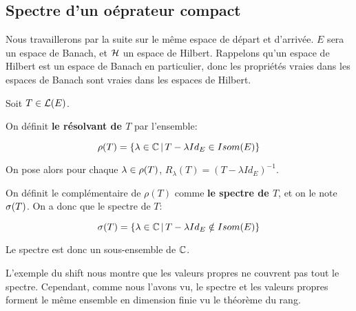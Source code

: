 

	

\subsection{Spectre d'un oéprateur compact}

Nous travaillerons par la suite sur le même espace de départ et d'arrivée. $E$
sera un espace de Banach, et $\mathcal{H}$ un espace de Hilbert.
Rappelons qu'un espace de Hilbert est un espace de Banach en particulier, donc
les propriétés vraies dans les espaces de Banach sont vraies dans les espaces de
Hilbert.

\begin{definition}
	Soit $T \in \mathcal{L}(E)$.

	On définit \textbf{le résolvant de $T$} par l'ensemble:

	\begin{equation}
		\rho(T) = \left\{\lambda \in \mathbb{C} \, | \, T - \lambda
			{Id}_{E} \in Isom(E) \right\}
			\label{def:resolvant_operator}
	\end{equation}

	On pose alors pour chaque $\lambda \in \rho(T)$, $R_{\lambda}(T) = (T -
	\lambda Id_{E})^{-1}$.

	On définit le complémentaire de $\rho(T)$ comme \textbf{le spectre de $T$},
	et on le note $\sigma(T)$.
	On a donc que le spectre de $T$:

	\begin{equation}
		\sigma(T) = \left\{\lambda \in \mathbb{C} \, | \, T - \lambda {Id}_{E}
		\notin Isom(E) \right\}
		\label{def:spectrum_operator}
	\end{equation}
\end{definition}

Le spectre est donc un sous-ensemble de $\mathbb{C}$.

L'exemple du shift nous montre que les valeurs propres ne couvrent pas tout le
spectre.
Cependant, comme nous l'avons vu, le spectre et les valeurs propres forment le
même ensemble en dimension finie vu le théorème du rang.

